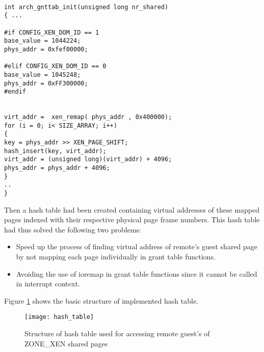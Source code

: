 \\
\begin{lstlisting}[caption=Code snippet for populating hash table for virtual address mapping of shared pages for two guests in ported setup, label={hash}]
int arch_gnttab_init(unsigned long nr_shared)
{ ...

#if CONFIG_XEN_DOM_ID == 1
base_value = 1044224;
phys_addr = 0xfef00000;

#elif CONFIG_XEN_DOM_ID == 0
base_value = 1045248;
phys_addr = 0xFF300000;
#endif


virt_addr =  xen_remap( phys_addr , 0x400000);
for (i = 0; i< SIZE_ARRAY; i++)
{
key = phys_addr >> XEN_PAGE_SHIFT; 
hash_insert(key, virt_addr);
virt_addr = (unsigned long)(virt_addr) + 4096;
phys_addr = phys_addr + 4096;
}
..
}
\end{lstlisting}
Then a hash table had been created containing virtual addresses of these mapped pages indexed with their respective physical page frame numbers. This hash table had thus solved the following two problems:

\begin{itemize}
	\item Speed up the process of finding virtual address of remote's guest shared page by not mapping each page individually in grant table functions.
	\item Avoiding the use of ioremap in grant table functions since it cannot be called in interrupt context.
\end{itemize}

Figure \ref{hash_table} shows the basic structure of implemented hash table.

\begin{figure}[!htbp]
	\centering
	\texttt{[image: hash\_table]}
	\caption{Structure of hash table used for accessing remote guest's of ZONE\_XEN shared pages}
	\label{hash_table}
\end{figure}


